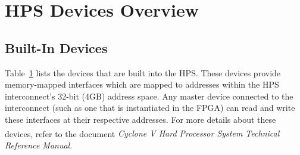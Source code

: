 \documentclass[11pt, twoside, pdftex]{article}
\begin{document}
\clearpage
\newpage





\section{HPS Devices Overview}

\subsection{Built-In Devices}
\label{sec:built_in_devices}

Table~\hyperref[tab:builtindevices]{1} lists the devices that are built into the HPS. 
These devices provide memory-mapped interfaces which are mapped to addresses within the HPS interconnect's 32-bit (4GB) address space. 
Any master device connected to the interconnect (such as one that is instantiated in the FPGA) can read and write these interfaces at their respective addresses. 
For more details about these devices, refer to the document \textit{Cyclone\textsuperscript{\textregistered} V Hard Processor System Technical Reference Manual}.

\end{document}
